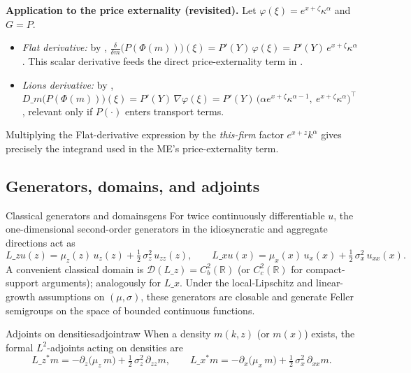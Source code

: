 \documentclass[11pt,letterpaper,oneside]{article}
\numberwithin{equation}{section}
\newcommand{\R}{\mathbb{R}}
\newcommand{\1}{\mathbf{1}}
\newcommand{\Lz}{L\_z}
\newcommand{\Lx}{L\_x}
\newcommand{\Lzadj}{L\_z^{\!*}}
\newcommand{\Dm}{D\_m}
\begin{document}
\begin{tcolorbox}[mathstyle]
\textbf{Application to the price externality (revisited).} Let $\varphi(\xi)=e^{x+\zeta}\kappa^\alpha$ and $G=P$.
\begin{itemize}[leftmargin=1.15em,itemsep=0.25em]
  \item \emph{Flat derivative:} by , $\tfrac{\delta}{\delta m}\big(P(\Phi(m))\big)(\xi)=P'(Y)\,\varphi(\xi)=P'(Y)\,e^{x+\zeta}\kappa^\alpha$. This scalar derivative feeds the direct price-externality term in .
  \item \emph{Lions derivative:} by , $\Dm\big(P(\Phi(m))\big)(\xi)=P'(Y)\,\nabla\varphi(\xi)=P'(Y)\,\big(\alpha e^{x+\zeta}\kappa^{\alpha-1},\ e^{x+\zeta}\kappa^\alpha\big)^{\!\top}$, relevant only if $P(\cdot)$ enters transport terms.
\end{itemize}
Multiplying the Flat-derivative expression by the \emph{this-firm} factor $e^{x+z}k^\alpha$ gives precisely the integrand used in the ME’s price-externality term.
\end{tcolorbox}

\subsection{Generators, domains, and adjoints}\label{sec:generators}

\begin{definition}{Classical generators and domains}{gens}
For twice continuously differentiable $u$, the one-dimensional second-order generators in the idiosyncratic and aggregate directions act as
\[
\Lz u(z)=\mu_z(z)\,u_z(z)+\tfrac12\,\sigma_z^2\,u_{zz}(z),\qquad
\Lx u(x)=\mu_x(x)\,u_x(x)+\tfrac12\,\sigma_x^2\,u_{xx}(x).
\]
A convenient classical domain is $\mathcal D(\Lz)=C_b^2(\R)$ (or $C_c^2(\R)$ for compact-support arguments); analogously for $\Lx$. Under the local-Lipschitz and linear-growth assumptions on $(\mu,\sigma)$, these generators are closable and generate Feller semigroups on the space of bounded continuous functions.
\end{definition}

\begin{definition}{Adjoints on densities}{adjointraw}
When a density $m(k,z)$ (or $m(x)$) exists, the formal $L^2$-adjoints acting on densities are
\[
\Lzadj m = -\partial_z\big(\mu_z\, m\big) + \tfrac12\, \sigma_z^2\, \partial_{zz} m,\qquad
\Lx^{\!*} m = -\partial_x\big(\mu_x\, m\big) + \tfrac12\, \sigma_x^2\, \partial_{xx} m.
\]
\end{definition}
\end{document}
